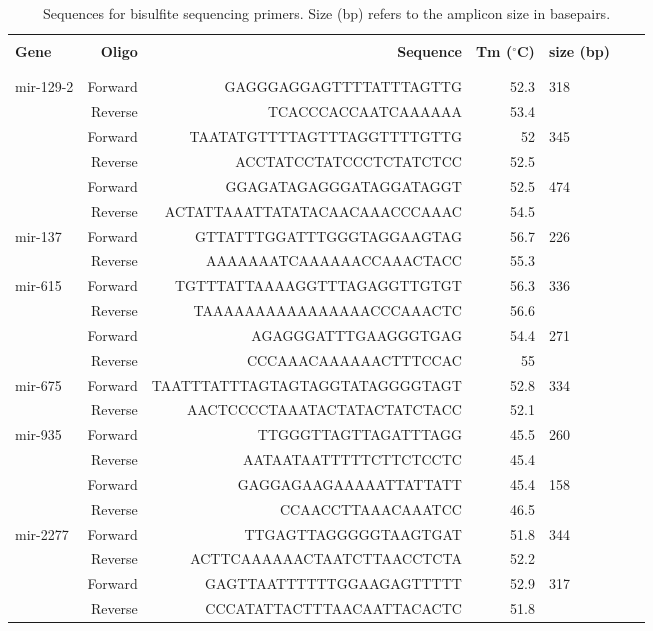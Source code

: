\begin{table}
{\scriptsize
\caption{Sequences for bisulfite sequencing primers. Size (bp) refers to the amplicon size in basepairs.}
\begin{tabular}{lrrrlll}
\hline
& & & & & & \\
\textbf{Gene}	&	\textbf{Oligo}	&	\textbf{Sequence} &	\textbf{Tm ($^{\circ}$C)} &	\textbf{size (bp)}\\
& & & & & &
\\
\hline
& & & & & &
\\
mir-129-2	&	Forward	&	GAGGGAGGAGTTTTATTTAGTTG  &	52.3	&	318\\
{}	&	Reverse	&	TCACCCACCAATCAAAAAA	&	53.4	&	{}\\
{}	&	Forward	&	TAATATGTTTTAGTTTAGGTTTTGTTG	&	52	&	345\\
{}	&	Reverse	&	ACCTATCCTATCCCTCTATCTCC	&	52.5	&	{}\\
{}	&	Forward	&	GGAGATAGAGGGATAGGATAGGT	&	52.5	&	474\\
{}	&	Reverse	&	ACTATTAAATTATATACAACAAACCCAAAC	&	54.5	&	{}\\
mir-137	&	Forward	&	GTTATTTGGATTTGGGTAGGAAGTAG	&	56.7	&	226\\
{}	&	Reverse	&	AAAAAAATCAAAAAACCAAACTACC	&	55.3	&	{}\\
mir-615	&	Forward	&	TGTTTATTAAAAGGTTTAGAGGTTGTGT	&	56.3	&	336\\
{}	&	Reverse	&	TAAAAAAAAAAAAAAAACCCAAACTC	&	56.6	&	{}\\
{}	&	Forward	&	AGAGGGATTTGAAGGGTGAG	&	54.4	&	271\\
{}	&	Reverse	&	CCCAAACAAAAAACTTTCCAC	&	55	&	{}\\
mir-675	&	Forward	&	TAATTTATTTAGTAGTAGGTATAGGGGTAGT	&	52.8	&	334\\
{}	&	Reverse	&	AACTCCCCTAAATACTATACTATCTACC	&	52.1	&	{}\\
mir-935	&	Forward	&	TTGGGTTAGTTAGATTTAGG	&	45.5	&	260\\
{}	&	Reverse	&	AATAATAATTTTTCTTCTCCTC	&	45.4	&	{}\\
{}	&	Forward	&	GAGGAGAAGAAAAATTATTATT	&	45.4	&	158\\
{}	&	Reverse	&	CCAACCTTAAACAAATCC	&	46.5	&	{}\\
mir-2277	&	Forward	&	TTGAGTTAGGGGGTAAGTGAT	&	51.8	&	344\\
{}	&	Reverse	&	ACTTCAAAAAACTAATCTTAACCTCTA	&	52.2	&	{}\\
{}	&	Forward	&	GAGTTAATTTTTTGGAAGAGTTTTT	&	52.9	&	317\\
{}	&	Reverse	&	CCCATATTACTTTAACAATTACACTC	&	51.8	&	{}\\

\end{tabular}}
\end{table}
